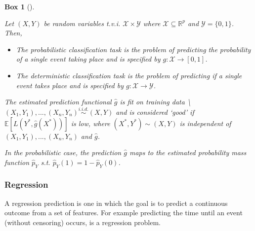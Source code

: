 \documentclass[
  letterpaper,
]{scrbook}
\providecommand{\tightlist}{%
  \setlength{\itemsep}{0pt}\setlength{\parskip}{0pt}}\usepackage{longtable,booktabs,array}
\theoremstyle{plain}
\newtheorem{conjecture}{Box}[chapter]
\theoremstyle{definition}
\theoremstyle{remark}
\begin{document}
\begin{tcolorbox}[enhanced jigsaw, title={Classification Task}, breakable, leftrule=.75mm, rightrule=.15mm, opacityback=0, coltitle=black, colback=white, toptitle=1mm, toprule=.15mm, bottomtitle=1mm, titlerule=0mm, arc=.35mm, bottomrule=.15mm, colbacktitle=quarto-callout-note-color!10!white, left=2mm, opacitybacktitle=0.6, colframe=quarto-callout-note-color-frame]

\leavevmode{}%
\begin{conjecture}[]\label{cnj-task-classif}

Let \((X,Y)\) be random variables t.v.i.
\(\mathcal{X}\times \mathcal{Y}\) where
\(\mathcal{X}\subseteq \mathbb{R}^p\) and \(\mathcal{Y}= \{0, 1\}\).
Then,

\begin{itemize}
\tightlist
\item
  The \emph{probabilistic classification task} is the problem of
  predicting the probability of a single event taking place and is
  specified by \(g: \mathcal{X}\rightarrow [0, 1]\).
\item
  The \emph{deterministic classification task} is the problem of
  predicting if a single event takes place and is specified by
  \(g: \mathcal{X}\rightarrow \mathcal{Y}\).
\end{itemize}

The estimated prediction functional \(\hat{g}\) is fit on training data
\textbackslash{}\((X_1,Y_1),...,(X_n,Y_n) \stackrel{i.i.d.}\sim(X,Y)\)
and is considered `good' if \(\mathbb{E}[L(Y^*, \hat{g}(X^*))]\) is low,
where \((X^*, Y^*) \sim (X, Y)\) is independent of
\((X_1,Y_1),...,(X_n,Y_n)\) and \(\hat{g}\).

In the probabilistic case, the prediction \(\hat{g}\) maps to the
estimated probability mass function \(\hat{p}_Y\) s.t.
\(\hat{p}_Y(1) = 1 - \hat{p}_Y(0)\).

\end{conjecture}

\end{tcolorbox}

\subsubsection{Regression}
\label{sec:surv_ml_regr}

A regression prediction is one in which the goal is to predict a
continuous outcome from a set of features. For example predicting the
time until an event (without censoring) occurs, is a regression problem.
\end{document}
